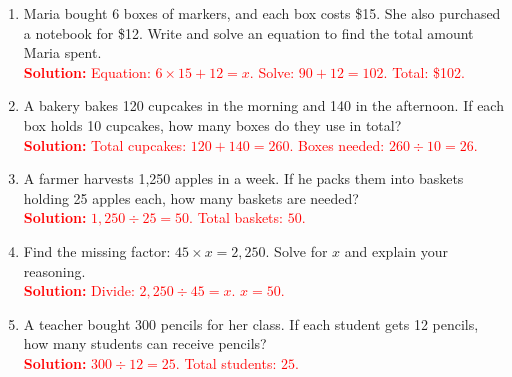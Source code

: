 \documentclass[12pt]{article}
\begin{document}
\begin{tcolorbox}[colframe=black!60, colback=white, 
coltitle=black, colbacktitle=black!15, fonttitle=\bfseries\Large, 
title=Problems, halign title=center, left=10pt, right=10pt, top=10pt, bottom=100pt]
\begin{enumerate}[start=9, itemsep=5em]
    \item Maria bought 6 boxes of markers, and each box costs \$15. She also purchased a notebook for \$12. Write and solve an equation to find the total amount Maria spent.\\
    \textcolor{red}{\textbf{Solution:} 
    Equation: \( 6 \times 15 + 12 = x \). 
    Solve: \( 90 + 12 = 102 \). Total: \$102.}

    \item A bakery bakes 120 cupcakes in the morning and 140 in the afternoon. If each box holds 10 cupcakes, how many boxes do they use in total?\\
    \textcolor{red}{\textbf{Solution:} 
    Total cupcakes: \( 120 + 140 = 260 \). 
    Boxes needed: \( 260 \div 10 = 26 \).}

    \item A farmer harvests 1,250 apples in a week. If he packs them into baskets holding 25 apples each, how many baskets are needed?\\
    \textcolor{red}{\textbf{Solution:} 
    \( 1,250 \div 25 = 50 \). Total baskets: \( 50 \).}

    \item Find the missing factor: \( 45 \times x = 2,250 \). Solve for \( x \) and explain your reasoning.\\
    \textcolor{red}{\textbf{Solution:} 
    Divide: \( 2,250 \div 45 = x \). 
    \( x = 50 \).}

    \item A teacher bought 300 pencils for her class. If each student gets 12 pencils, how many students can receive pencils?\\
    \textcolor{red}{\textbf{Solution:} 
    \( 300 \div 12 = 25 \). 
    Total students: \( 25 \).}
\end{enumerate}
\end{tcolorbox}

\vspace{1em}
\end{document}
